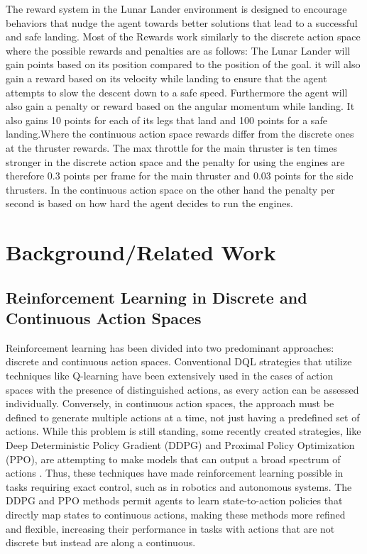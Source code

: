 \documentclass[conference]{IEEEtran}
\begin{document}
The reward system in the Lunar Lander environment is designed to encourage behaviors that nudge the agent towards better solutions that lead to a successful and safe landing. Most of the Rewards work similarly to the discrete action space where the possible rewards and penalties are as follows: The Lunar Lander will gain points based on its position compared to the position of the goal. it will also gain a reward based on its velocity while landing to ensure that the agent attempts to slow the descent down to a safe speed. Furthermore the agent will also gain a penalty or reward based on the angular momentum while landing. It also gains 10 points for each of its legs that land and 100 points for a safe landing.Where the continuous action space rewards differ from the discrete ones at the thruster rewards. The max throttle for the main thruster is ten times stronger in the discrete action space and the penalty for using the engines are therefore 0.3 points per frame for the main thruster and 0.03 points for the side thrusters. In the continuous action space on the other hand the penalty per second is based on how hard the agent decides to run the engines.



\section{Background/Related Work}


\subsection{Reinforcement Learning in Discrete and Continuous Action Spaces}
Reinforcement learning has been divided into two predominant approaches: discrete and continuous action spaces.\cite{han2019energy} Conventional DQL strategies that utilize techniques like Q-learning have been extensively used in the cases of action spaces with the presence of distinguished actions, as every action can be assessed individually. Conversely, in continuous action spaces, the approach must be defined to generate multiple actions at a time, not just having a predefined set of actions. While this problem is still standing, some recently created strategies, like Deep Deterministic Policy Gradient (DDPG) and Proximal Policy Optimization (PPO), are attempting to make models that can output a broad spectrum of actions \cite{guttulsrud2023solving}. Thus, these techniques have made reinforcement learning possible in tasks requiring exact control, such as in robotics and autonomous systems. The DDPG and PPO methods permit agents to learn state-to-action policies that directly map states to continuous actions\cite{tang2020discretizing}, making these methods more refined and flexible, increasing their performance in tasks with actions that are not discrete but instead are along a continuous.
\end{document}
